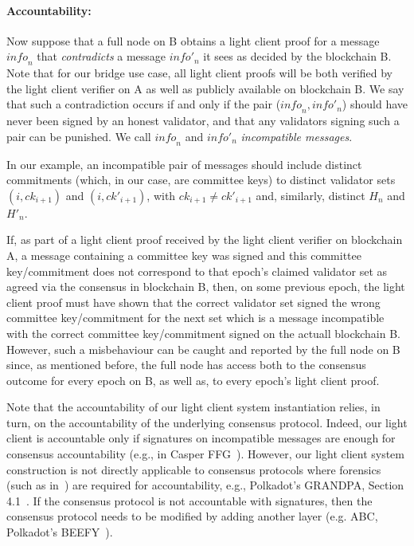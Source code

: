 \noindent\paragraph{Accountability:} Now suppose that a full node on B obtains a light client proof for a message 
$\mathit{info}_n$ that \emph{contradicts} a message $\mathit{info}'_n$ it sees as decided by the blockchain B. Note that for our bridge 
use case, all light client proofs will be both verified by the light client verifier on A as well as publicly available on blockchain B. 
We say that such a contradiction occurs if and only if the pair ($\mathit{info}_n, \mathit{info}'_n$) should have never been  
signed by an honest validator, and that any validators signing such a pair can be punished. We call $\mathit{info}_n$ and 
$\mathit{info}'_n$ \emph{incompatible messages}. 

In our example, an incompatible pair of messages should include 
distinct commitments (which, in our case, are committee keys) to distinct validator sets 
$(i,\mathit{ck}_{i+1})$ and $(i,\mathit{ck}'_{i+1})$, with $\mathit{ck}_{i+1} \neq \mathit{ck}'_{i+1}$ and, similarly,  
distinct $H_n$ and $H'_n$. 


If, as part of a light client proof received by the light client verifier on blockchain A, a message containing a committee 
key was signed and this committee key/commitment does not correspond to that epoch's claimed validator set as agreed 
via the consensus in blockchain B, then, on some previous epoch, the light client proof must have shown that the correct 
validator set signed the wrong committee key/commitment for the next set which is a message incompatible with the 
correct committee key/commitment signed on the actuall blockchain B. However, such a misbehaviour can be caught and 
reported by the full node on B since, as mentioned before, the full node has access both to the consensus outcome for 
every epoch on B, as well as, to every epoch's light client proof. 

Note that the accountability of our light client system instantiation relies, in turn, on the accountability of the underlying consensus 
protocol. Indeed, our light client is accountable only if signatures on incompatible messages are enough for consensus 
accountability (e.g., in Casper FFG~\cite{CasperFFG}). However, our light client system construction 
is not directly applicable to consensus protocols where forensics (such as in~\cite{forensics}) are required for accountability, 
e.g., Polkadot's GRANDPA, Section 4.1~\cite{GRANDPA}. If the consensus protocol is not accountable with signatures, 
then the consensus protocol needs to be modified by adding another layer (e.g. ABC\cite{ABC}, Polkadot's BEEFY~\cite{BEEFY}).
\vspace{-0.05in}

